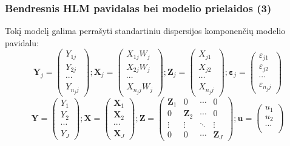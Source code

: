 \documentclass[utf8,hyperref={unicode,pdftex}]{beamer}
\begin{document}
\begin{frame}
\frametitle{Bendresnis HLM pavidalas bei modelio prielaidos (3)}
\small
Tokį modelį galima perrašyti standartiniu dispersijos komponenčių modelio pavidalu:
\[
\mathbf{Y}_j=\begin{pmatrix}
Y_{1j}\\
Y_{2j}\\
\cdots\\
Y_{n_jj}
 \end{pmatrix} ;
\mathbf{X}_j=
\begin{pmatrix}
X_{1j}W_j\\
X_{2j}W_j\\
\cdots\\
X_{n_jj}W_j
 \end{pmatrix} ;
\mathbf{Z}_{j} =
 \begin{pmatrix}
X_{j1}   \\
X_{j2}  \\
  \cdots  \\
X_{n_jj}
 \end{pmatrix};
\boldsymbol{\varepsilon}_{j} =
 \begin{pmatrix}
\varepsilon_{j1}   \\
\varepsilon_{j2}  \\
  \cdots  \\
\varepsilon_{n_jj}
 \end{pmatrix} 
\]
\[
\mathbf{Y}=\begin{pmatrix}
Y_{1}\\
Y_{2}\\
\cdots\\
Y_{J}
 \end{pmatrix} ;
\mathbf{X}=
\begin{pmatrix}
\mathbf{X}_{1}\\
\mathbf{X}_{2}\\
\cdots\\
\mathbf{X}_{J}
 \end{pmatrix} ;
\mathbf{Z} =
 \begin{pmatrix}
\mathbf{Z}_{1} &0&\cdots&0  \\
0& \mathbf{Z}_{2}&\cdots&0  \\
  \vdots  & \vdots  & \ddots & \vdots  \\
0&0&\cdots& \mathbf{Z}_J
 \end{pmatrix};
\mathbf{u}=
 \begin{pmatrix}
u_{1}   \\
u_{2}  \\
  \cdots  \\

\end{pmatrix}\]
\end{frame}
\end{document}
